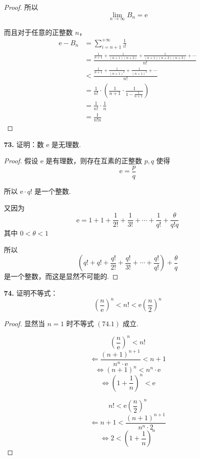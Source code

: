\begin{proof}
    所以
    \[\lim_{n \rightarrow \infty} B_n = \mathrm{e} \tag{72.6}\]

    而且对于任意的正整数 $n$，
    \begin{align*}
        \mathrm{e} - B_n &= \sum_{i=n+1}^{+\infty} \frac{1}{i!}\\
        &= \frac{\frac{1}{n+1} + \frac{1}{(n+1)(n+2)} + \frac{1}{(n+1)(n+2)(n+3)} + \cdots}{n!}\\
        &< \frac{\frac{1}{n+1} + \frac{1}{(n+1)^2} + \frac{1}{(n+1)^3} + \cdots}{n!}\\
        &= \frac{1}{n!} \cdot \left(\frac{1}{n+1} \cdot \frac{1}{1 - \frac{1}{n+1}}\right)\\
        &= \frac{1}{n!} \cdot \frac{1}{n}\\
        &= \frac{1}{n!n}
    \end{align*}
\end{proof}\vspace{9pt}

\textbf{73.} 证明：数 $\mathrm{e}$ 是无理数.
\begin{proof}
    假设 $\mathrm{e}$ 是有理数，则存在互素的正整数 $p,q$ 使得
    \[\mathrm{e} = \frac{p}{q}\]

    所以 $\mathrm{e} \cdot q!$ 是一个整数.

    又因为
    \[\mathrm{e} = 1 + 1 + \frac{1}{2!} + \frac{1}{3!} + \cdots + \frac{1}{q!} + \frac{\theta}{q!q}\]
    其中 $0 < \theta < 1$

    所以
    \[\left(q! + q! + \frac{q!}{2!} + \frac{q!}{3!} + \cdots + \frac{q!}{q!}\right) + \frac{\theta}{q}\]
    是一个整数，而这是显然不可能的.
\end{proof}\vspace{9pt}

\textbf{74.} 证明不等式：
\[\left(\frac{n}{\mathrm{e}}\right)^n < n! < \mathrm{e} \left(\frac{n}{2}\right)^n \tag{74.1}\]
\begin{proof}
    显然当 $n=1$ 时不等式 $(74.1)$ 成立.

    \[\left(\frac{n}{\mathrm{e}}\right)^n < n! \tag{74.2}\]
    \[\Leftarrow \frac{(n+1)^{n+1}}{n^n \cdot \mathrm{e}} < n+1\]
    \[\Leftrightarrow (n+1)^n < n^n \cdot \mathrm{e}\]
    \[\Leftrightarrow \left(1 + \frac{1}{n}\right)^n < \mathrm{e} \tag{74.3}\]

    \[n! < \mathrm{e} \left(\frac{n}{2}\right)^n \tag{74.4}\]
    \[\Leftarrow n+1 < \frac{(n+1)^{n+1}}{n^n \cdot 2}\]
    \[\Leftrightarrow 2 < \left(1 + \frac{1}{n}\right)^n \tag{74.5}\]
\end{proof}\vspace{9pt}

